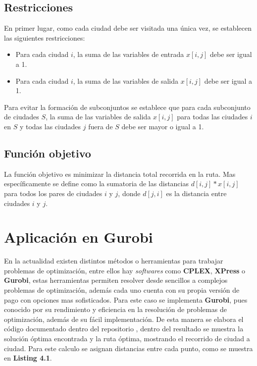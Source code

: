         \subsection{Restricciones}
            En primer lugar, como cada ciudad debe ser visitada una única vez, se establecen las siguientes restricciones: 
            
            \begin{itemize}
                \item Para cada ciudad \(i\), la suma de las variables de entrada \(x[i,j]\) debe ser igual a 1.
                \item Para cada ciudad \(i\), la suma de las variables de salida \(x[i,j]\) debe ser igual a 1.
            \end{itemize}
            
            Para evitar la formación de subconjuntos se establece que para cada subconjunto de ciudades \(S\), la suma de las variables de salida \(x[i,j]\) para todas las ciudades \(i\) en \(S\) y todas las ciudades \(j\) fuera de \(S\) debe ser mayor o igual a 1. 
            
        \subsection{Función objetivo}
            La función objetivo es minimizar la distancia total recorrida en la ruta. Mas específicamente se define como la sumatoria de las distancias \(d[i,j] * x[i,j]\) para todos los pares de ciudades \(i\) y \(j\), donde \(d[j,i]\) es la distancia entre ciudades \(i\) y \(j\). 

    \section{Aplicación en Gurobi}
        En la actualidad existen distintos métodos o herramientas para trabajar problemas de optimización, entre ellos hay \textit{softwares} como \textbf{CPLEX}, \textbf{XPress} o \textbf{Gurobi}, estas herramientas permiten resolver desde sencillos a complejos problemas de optimización, además cada uno cuenta con su propia versión de pago con opciones mas sofisticados. Para este caso se implementa \textbf{Gurobi}, pues conocido por su rendimiento y eficiencia en la resolución de problemas de optimización, además de su fácil implementación.
        \newline
        \newline
        De esta manera se elabora el código documentado dentro del repositorio \parencite{Github}, dentro del resultado se muestra la solución óptima encontrada y la ruta óptima, mostrando el recorrido de ciudad a ciudad. Para este calculo se asignan distancias entre cada punto, como se muestra en \textbf{Listing 4.1}.
        
